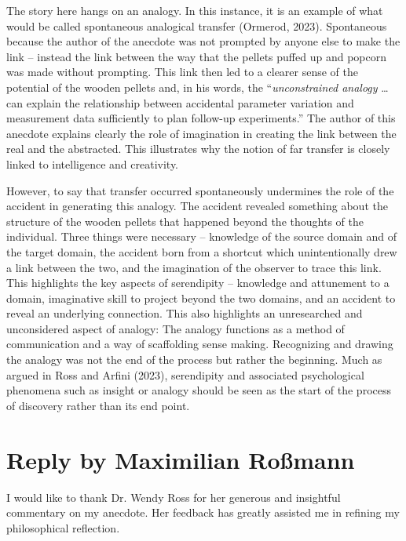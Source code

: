 \documentclass[authordate, commentary]{jote-new-article}
\begin{document}
	The story here hangs on an analogy. In this instance, it is an example of what would be called spontaneous analogical transfer (Ormerod, 2023). Spontaneous because the author of the anecdote was not prompted by anyone else to make the link -- instead the link between the way that the pellets puffed up and popcorn was made without prompting. This link then led to a clearer sense of the potential of the wooden pellets and, in his words, the “\emph{unconstrained analogy }… can explain the relationship between accidental parameter variation and measurement data sufficiently to plan follow-up experiments.” The author of this anecdote explains clearly the role of imagination in creating the link between the real and the abstracted. This illustrates why the notion of far transfer is closely linked to intelligence and creativity.



	However, to say that transfer occurred spontaneously undermines the role of the accident in generating this analogy. The accident revealed something about the structure of the wooden pellets that happened beyond the thoughts of the individual. Three things were necessary -- knowledge of the source domain and of the target domain, the accident born from a shortcut which unintentionally drew a link between the two, and the imagination of the observer to trace this link. This highlights the key aspects of serendipity -- knowledge and attunement to a domain, imaginative skill to project beyond the two domains, and an accident to reveal an underlying connection. This also highlights an unresearched and unconsidered aspect of analogy: The analogy functions as a method of communication and a way of scaffolding sense making. Recognizing and drawing the analogy was not the end of the process but rather the beginning. Much as argued in Ross and Arfini (2023), serendipity and associated psychological phenomena such as insight or analogy should be seen as the start of the process of discovery rather than its end point.



	\section{Reply by Maximilian Roßmann}



	I would like to thank Dr. Wendy Ross for her generous and insightful commentary on my anecdote. Her feedback has greatly assisted me in refining my philosophical reflection.
\end{document}
